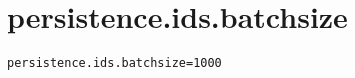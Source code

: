 \section{persistence.ids.batchsize}
\label{configuration:PersistenceIdsBatchsize}
\ClearAPI
\TODO
{}
\begin{lstlisting}[style=Props,caption={Usage example for \textit{persistence.ids.batchsize}}]
persistence.ids.batchsize=1000
\end{lstlisting}